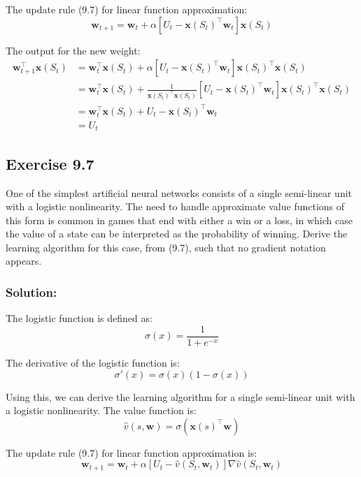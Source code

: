 The update rule (9.7) for linear function approximation: 
\[
    \mathbf{w}_{t+1} = \mathbf{w}_t + \alpha \left[ U_t - \mathbf{x}(S_t)^\top \mathbf{w}_t \right] \mathbf{x}(S_t)
\]

The output for the new weight:
\begin{align*}
    \mathbf{w}_{t+1}^\top \mathbf{x}(S_t) &= \mathbf{w}_t^\top \mathbf{x}(S_t) + \alpha \left[ U_t - \mathbf{x}(S_t)^\top \mathbf{w}_t \right] \mathbf{x}(S_t)^\top \mathbf{x}(S_t) \\
    &= \mathbf{w}_t^\top \mathbf{x}(S_t) + \frac{1}{\mathbf{x}(S_t)^\top \mathbf{x}(S_t)} \left[ U_t - \mathbf{x}(S_t)^\top \mathbf{w}_t \right] \mathbf{x}(S_t)^\top \mathbf{x}(S_t)  \\
    &= \mathbf{w}_t^\top \mathbf{x}(S_t) + U_t - \mathbf{x}(S_t)^\top \mathbf{w}_t \\
    &= U_t
\end{align*}


\subsection*{Exercise 9.7}

One of the simplest artificial neural networks consists of a single semi-linear
unit with a logistic nonlinearity. The need to handle approximate value functions of this
form is common in games that end with either a win or a loss, in which case the value of
a state can be interpreted as the probability of winning. Derive the learning algorithm
for this case, from (9.7), such that no gradient notation appears.

\subsubsection*{Solution:}


The logistic function is defined as:
\[
    \sigma(x) = \frac{1}{1 + e^{-x}}
\]

The derivative of the logistic function is:
\[
    \sigma'(x) = \sigma(x) (1 - \sigma(x))
\]

Using this, we can derive the learning algorithm for a single semi-linear unit with a logistic nonlinearity. The value function is:
\[
    \hat{v}(s, \mathbf{w}) = \sigma(\mathbf{x}(s)^\top \mathbf{w})
\]

The update rule (9.7) for linear function approximation is:
\[
    \mathbf{w}_{t+1} = \mathbf{w}_t + \alpha \left[ U_t - \hat{v}(S_t, \mathbf{w}_t) \right] \nabla \hat{v}(S_t, \mathbf{w}_t)
\]

